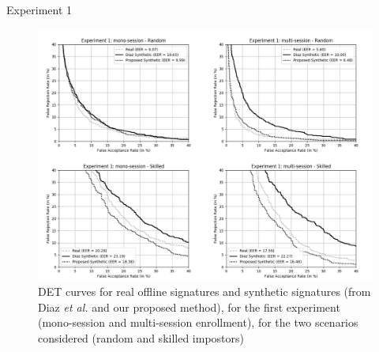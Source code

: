 \documentclass{beamer}
\begin{document}
\begin{frame}{Experiment 1}
\begin{figure}[!htb]
    \centering
    \includegraphics[width=1.05\textwidth]{rocs/experiment1}
    \caption{DET curves for real offline signatures and synthetic signatures (from Diaz \textit{et al.} and our proposed method), for the first experiment (mono-session and multi-session enrollment), for the two scenarios considered (random and skilled impostors)}
    \label{exp1}
\end{figure}
\end{frame}
\end{document}
